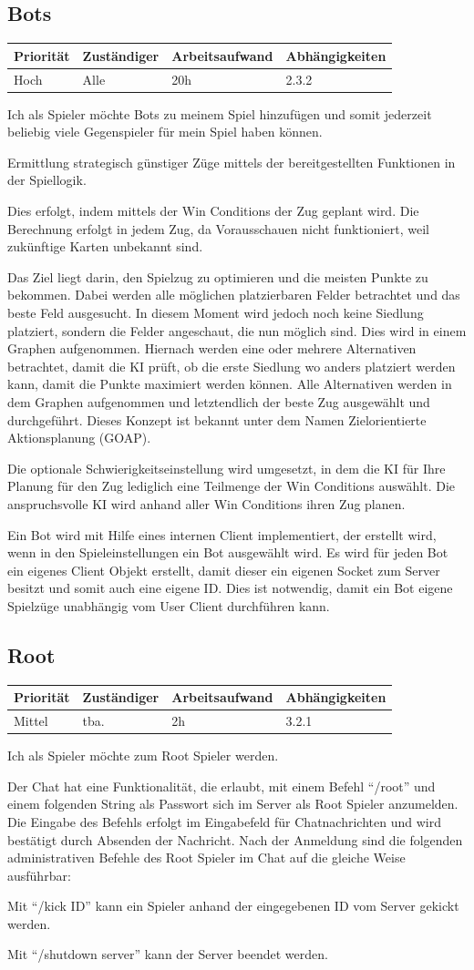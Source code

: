 \documentclass[a4paper]{scrreprt}
\newenvironment{requirement}[5] {
	\subsection{#1}
	\begin{tabularx}{\textwidth}{|X|l|X|X|}
		\hline
		Priorität & Zuständiger & Arbeitsaufwand & Abhängigkeiten \\
		\hline
		#2 & #3 & #4 & #5 \\
		\hline
	\end{tabularx}
	}{
	\newpage
	}
\begin{document}
\begin{requirement}{Bots}{Hoch}{Alle}{20h}{2.3.2}

\begin{center}
Ich als Spieler möchte Bots zu meinem Spiel hinzufügen und somit jederzeit beliebig viele Gegenspieler für mein Spiel haben können.
\end{center}

Ermittlung strategisch günstiger Züge mittels der bereitgestellten Funktionen in der Spiellogik.

Dies erfolgt, indem mittels der Win Conditions der Zug geplant wird. Die Berechnung erfolgt in jedem Zug, da Vorausschauen nicht funktioniert, weil zukünftige Karten unbekannt sind.

Das Ziel liegt darin, den Spielzug zu optimieren und die meisten Punkte zu bekommen. Dabei werden alle möglichen platzierbaren Felder betrachtet und das beste Feld ausgesucht. In diesem Moment wird jedoch noch keine Siedlung platziert, sondern die Felder angeschaut, die nun möglich sind. Dies wird in einem Graphen aufgenommen. Hiernach werden eine oder mehrere Alternativen betrachtet, damit die KI prüft, ob die erste Siedlung wo anders platziert werden kann, damit die Punkte maximiert werden können. Alle Alternativen werden in dem Graphen aufgenommen und letztendlich der beste Zug ausgewählt und durchgeführt. Dieses Konzept ist bekannt unter dem Namen Zielorientierte Aktionsplanung (GOAP).

Die optionale Schwierigkeitseinstellung wird umgesetzt, in dem die KI für Ihre Planung für den Zug lediglich eine Teilmenge der Win Conditions auswählt. Die anspruchsvolle KI wird anhand aller Win Conditions ihren Zug planen.

Ein Bot wird mit Hilfe eines internen Client implementiert, der erstellt wird, wenn in den Spieleinstellungen ein Bot ausgewählt wird. Es wird für jeden Bot ein eigenes Client Objekt erstellt, damit dieser ein eigenen Socket zum Server besitzt und somit auch eine eigene ID. Dies ist notwendig, damit ein Bot eigene Spielzüge unabhängig vom User Client durchführen kann.

\end{requirement}


\begin{requirement}{Root}{Mittel}{tba.}{2h}{3.2.1}

\begin{center}
	Ich als Spieler möchte zum Root Spieler werden.
\end{center}

Der Chat hat eine Funktionalität, die erlaubt, mit einem Befehl “/root” und einem folgenden String als Passwort sich im Server als Root Spieler anzumelden. Die Eingabe des Befehls erfolgt im Eingabefeld für Chatnachrichten und wird bestätigt durch Absenden der Nachricht.
Nach der Anmeldung sind die folgenden administrativen Befehle des Root Spieler im Chat auf die gleiche Weise ausführbar:

Mit “/kick ID” kann ein Spieler anhand der eingegebenen ID vom Server gekickt werden.

Mit “/shutdown server” kann der Server beendet werden.

\end{requirement}
\end{document}
